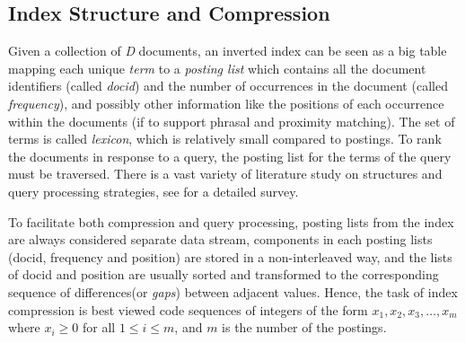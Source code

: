 \documentclass{sig-alternate-05-2015}
\begin{document}
\subsection{Index Structure and Compression}
Given a collection of \textit{D} documents, an inverted index can be seen as a big table mapping each unique \textit{term} to a\textit{ posting list} which contains all the document identifiers (called \textit{docid}) and the number of occurrences in the document (called \textit{frequency}), and possibly other information like the positions of each occurrence within the documents (if to support phrasal and proximity matching).
The set of terms is called \textit{lexicon}, which is relatively small compared to postings.
To rank the documents in response to a query, the posting list for the terms of the query must be traversed.
There is a vast variety of literature study on structures and query processing strategies, see \cite{ding2011faster,konow2013faster,navarro2010dual} for a detailed survey.


To facilitate both compression and query processing, posting lists from the index are always considered separate data stream, components in each posting lists (docid, frequency and position) are stored in a non-interleaved way, and the lists of docid and position are usually sorted and transformed to the corresponding sequence of differences(or \textit{gaps}) between adjacent values.
Hence, the task of index compression is best viewed code sequences of integers of the form $ x_{1},x_{2},x_{3},\ldots,x_{m} $ where $ x_{i}\geqslant0 $ for all $ 1\leqslant i\leqslant m $, and $ m $ is the number of the postings.
\end{document}
